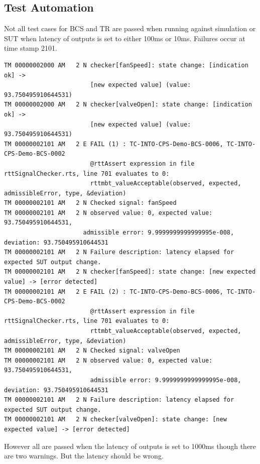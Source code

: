 \subsection{Test Automation}

Not all test cases for BCS and TR are passed when running against simulation or SUT when latency of outputs is set to either 100ms or 10ms. Failures occur at time stamp 2101.
\begin{lstlisting}
TM 00000002000 AM   2 N checker[fanSpeed]: state change: [indication ok] -> 
                        [new expected value] (value: 93.750495910644531)
TM 00000002000 AM   2 N checker[valveOpen]: state change: [indication ok] -> 
                        [new expected value] (value: 93.750495910644531)
TM 00000002101 AM   2 E FAIL (1) : TC-INTO-CPS-Demo-BCS-0006, TC-INTO-CPS-Demo-BCS-0002
                        @rttAssert expression in file rttSignalChecker.rts, line 701 evaluates to 0:
                        rttmbt_valueAcceptable(observed, expected, admissibleError, type, &deviation)
TM 00000002101 AM   2 N Checked signal: fanSpeed
TM 00000002101 AM   2 N observed value: 0, expected value: 93.750495910644531, 
                      admissible error: 9.9999999999999995e-008, deviation: 93.750495910644531
TM 00000002101 AM   2 N Failure description: latency elapsed for expected SUT output change.
TM 00000002101 AM   2 N checker[fanSpeed]: state change: [new expected value] -> [error detected]
TM 00000002101 AM   2 E FAIL (2) : TC-INTO-CPS-Demo-BCS-0006, TC-INTO-CPS-Demo-BCS-0002
                        @rttAssert expression in file rttSignalChecker.rts, line 701 evaluates to 0:
                        rttmbt_valueAcceptable(observed, expected, admissibleError, type, &deviation)
TM 00000002101 AM   2 N Checked signal: valveOpen
TM 00000002101 AM   2 N observed value: 0, expected value: 93.750495910644531, 
                        admissible error: 9.9999999999999995e-008, deviation: 93.750495910644531
TM 00000002101 AM   2 N Failure description: latency elapsed for expected SUT output change.
TM 00000002101 AM   2 N checker[valveOpen]: state change: [new expected value] -> [error detected]
\end{lstlisting}

However all are passed when the latency of outputs is set to 1000ms though there are two warnings. But the latency should be wrong.


